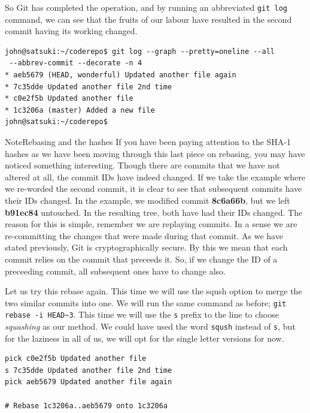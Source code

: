 So Git has completed the operation, and by running an abbreviated \texttt{git log} command, we can see that the fruits of our labour have resulted in the second commit having its working changed.

\begin{Verbatim}
john@satsuki:~/coderepo$ git log --graph --pretty=oneline --all
 --abbrev-commit --decorate -n 4
* aeb5679 (HEAD, wonderful) Updated another file again
* 7c35dde Updated another file 2nd time
* c0e2f5b Updated another file
* 1c3206a (master) Added a new file
john@satsuki:~/coderepo$
\end{Verbatim}

\begin{callout}{Note}{Rebasing and the hashes}
If you have been paying attention to the SHA-1 hashes as we have been moving through this last piece on rebasing, you may have noticed something interesting.
Though there are commits that we have not altered at all, the commit IDs have indeed changed.
If we take the example where we re-worded the second commit, it is clear to see that subsequent commits have their IDs changed.
In the example, we modified commit \textbf{8c6a66b}, but we left \textbf{b91ec84} untouched.
In the resulting tree, both have had their IDs changed.
\newline
\newline
The reason for this is simple, remember we are replaying commits.
In a sense we are re-committing the changes that were made during that commit.
As we have stated previously, Git is cryptographically secure.
By this we mean that each commit relies on the commit that preceeds it.
So, if we change the ID of a preceeding commit, all subsequent ones have to change also.
\end{callout}

Let us try this rebase again.
This time we will use the sqush option to merge the two similar commits into one.
We will run the same command as before; \texttt{git rebase -i HEAD\textasciitilde3}.
This time we will use the \texttt{s} prefix to the line to choose \emph{squashing} as our method.
We could have used the word \texttt{sqush} instead of \texttt{s}, but for the laziness in all of us, we will opt for the single letter versions for now.

\begin{Verbatim}
pick c0e2f5b Updated another file
s 7c35dde Updated another file 2nd time
pick aeb5679 Updated another file again

# Rebase 1c3206a..aeb5679 onto 1c3206a
\end{Verbatim}

